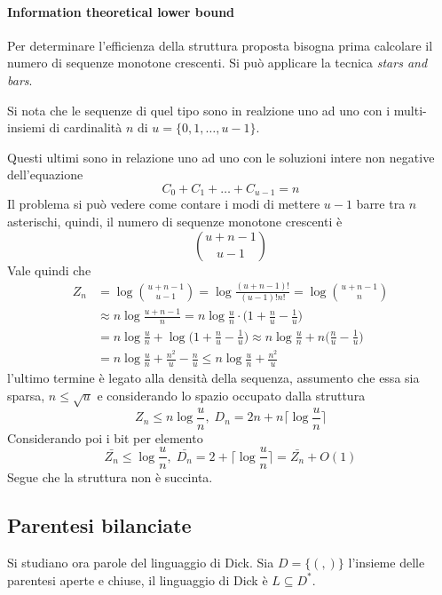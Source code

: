 \paragraph{Information theoretical lower bound}
Per determinare l'efficienza della struttura proposta bisogna prima calcolare 
il numero di sequenze monotone crescenti.
Si può applicare la tecnica \emph{stars and bars}.

Si nota che le sequenze di quel tipo sono in realzione uno ad uno 
con i multi-insiemi di cardinalità $n$ di $u = \{0,1,\dots, u-1\}$.

Questi ultimi sono in relazione uno ad uno con le soluzioni intere non negative
dell'equazione 
$$C_0 + C_1 + \dots + C_{u-1} = n$$
Il problema si può vedere come contare i modi di mettere $u-1$ barre tra $n$ asterischi, 
quindi, il numero di sequenze monotone crescenti è
$$\binom{u + n-1}{u-1}$$
Vale quindi che 
\begin{equation}
    \begin{aligned}
        Z_n &= \log \binom{u + n-1}{u-1} = \log \frac{(u+n-1)!}{(u-1)! n!} = \log \binom
        {u+n-1}{n} \\
        &\approx n\log\frac{u+n-1}{n} = n\log\frac{u}{n}\cdot\bigg(1 + \frac{n}{u} - \frac{1}{u}\bigg)
        \\&= n\log\frac{u}{n} + \log \bigg(1 + \frac{n}{u} - \frac{1}{u}\bigg) \approx
        n\log\frac{u}{n} + n \bigg(\frac{n}{u} - \frac{1}{u}\bigg)\\
        &= n \log \frac{u}{n} + \frac{n^2}{u} - \frac{n}{u} \leq n\log\frac{u}{n} + \frac{n^2}{u}
    \end{aligned}
\end{equation}
l'ultimo termine è legato alla densità della sequenza, assumento che essa sia sparsa, 
$n \leq \sqrt{u}$ e considerando lo spazio occupato dalla struttura
$$Z_n \leq n\log\frac{u}{n},\; D_n = 2n + n\bigg\lceil \log \frac{u}{n}\bigg\rceil$$
Considerando poi i bit per elemento
$$\bar{Z_n} \leq \log\frac{u}{n}, \; \bar{D_n} = 2 + \bigg\lceil \log \frac{u}{n}\bigg\rceil 
= \bar{Z_n} + O(1)$$
Segue che la struttura non è succinta.

\subsection{Parentesi bilanciate}

Si studiano ora parole del linguaggio di Dick.
Sia $D = \{(, ) \}$ l'insieme delle parentesi aperte e chiuse, 
il linguaggio di Dick è $L \subseteq D^*$.

